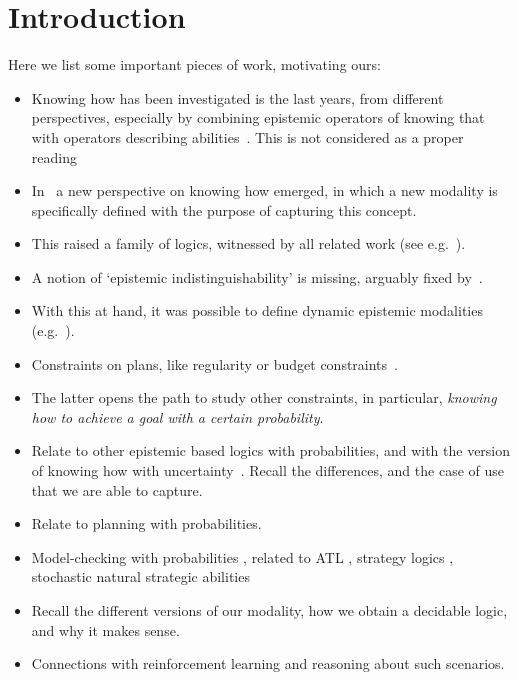 \section{Introduction}
\label{sec:intro}

Here we list some important pieces of work, motivating ours:

\begin{itemize}
    \item Knowing how has been investigated is the last years, from different perspectives, especially by combining epistemic operators of knowing that with operators describing abilities~\cite{Mccarthy69,Moore85,Les00,Hoek00,HerzigT06}. This is not considered as a proper reading~\cite{JamrogaA07,Herzig15}
    \item In~\cite{Wang15lori,Wang16,Wang2016} a new perspective on knowing how emerged, in which a new modality is specifically defined with the purpose of capturing this concept.
    \item This raised a family of logics, witnessed by all related work (see e.g.~\cite{LiWang17,Li17,Li17bis,FervariHLW17,LiW21,NaumovT17,NaumovT18,NaumovT19,Naumov2018a}).
    \item A notion of `epistemic indistinguishability' is missing, arguably fixed by~\cite{AFSVQ21,AFSVQ23}.
    \item With this at hand, it was possible to define dynamic epistemic modalities (e.g.~\cite{AFSV22}).
    \item Constraints on plans, like regularity or budget constraints~\cite{DemriF23}.
    \item The latter opens the path to study other constraints, in particular, \emph{knowing how to achieve a goal with a certain probability}.
    \item Relate to other epistemic based logics with probabilities, and with the version of knowing how with uncertainty~\cite{NaumovT19}. Recall the differences, and the case of use that we are able to capture.
    \item Relate to planning with probabilities.
    \item Model-checking with probabilities \cite{BaierAFK18}, related to ATL \cite{BA95,TJ07,BullingJ09}, strategy logics \cite{AKMM19}, stochastic natural strategic abilities \cite{BerthonKMM24}
    \item Recall the different versions of our modality, how we obtain a decidable logic, and why it makes sense.
    \item Connections with reinforcement learning and reasoning about such scenarios.
\end{itemize}